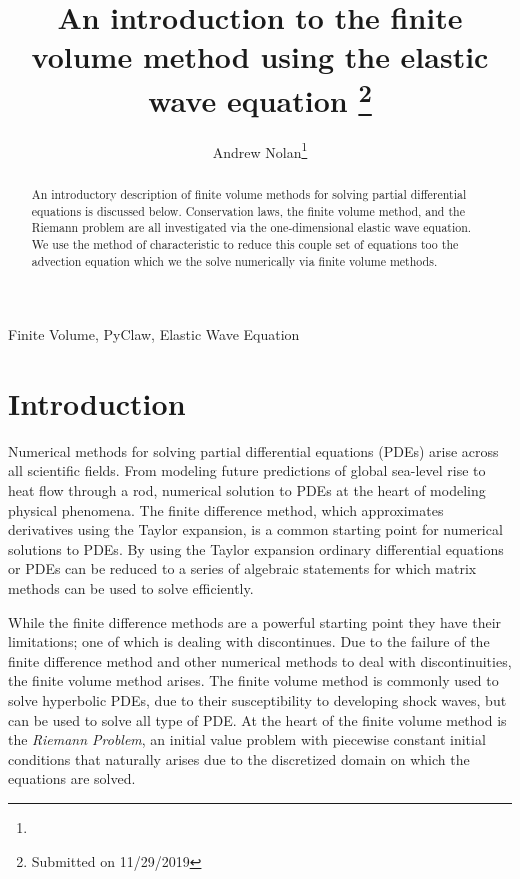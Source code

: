 \documentclass[review,onefignum,onetabnum]{siamart171218}
\title{An introduction to the finite volume method using the elastic wave equation 
\thanks{Submitted on 11/29/2019}}
\author{Andrew Nolan\thanks{\email{anolan@sfu.ca}}}
\begin{document}
\maketitle

\begin{abstract}
    An introductory description of finite volume methods for solving partial differential equations is discussed below. Conservation laws, the finite volume method, and the Riemann problem are all investigated via the one-dimensional elastic wave equation. We use the method of characteristic to reduce this couple set of equations too the advection equation which we the solve numerically via finite volume methods.
\end{abstract}

\begin{keywords}
  Finite Volume, PyClaw, Elastic Wave Equation
\end{keywords}


\section{Introduction} 
Numerical methods for solving partial differential equations (PDEs) arise across all scientific fields. From modeling future predictions of global sea-level rise to heat flow through a rod, numerical solution to PDEs at the heart of modeling physical phenomena. The finite difference method, which approximates derivatives using the Taylor expansion, is a common starting point for numerical solutions to PDEs. By using the Taylor expansion ordinary differential equations or PDEs can be reduced to a series of algebraic statements for which matrix methods can be used to solve efficiently.  

While the finite difference methods are a powerful starting point they have their limitations; one of which is dealing with discontinues. Due to the failure of the finite difference method and other numerical methods to deal with discontinuities, the finite volume method arises. The finite volume method is commonly used to solve hyperbolic PDEs, due to their susceptibility to developing shock waves, but can be used to solve all type of PDE. At the heart of the finite volume method is the \textit{Riemann Problem}, an initial value problem with piecewise constant initial conditions that naturally arises due to the discretized domain on which the equations are solved. 
\end{document}
